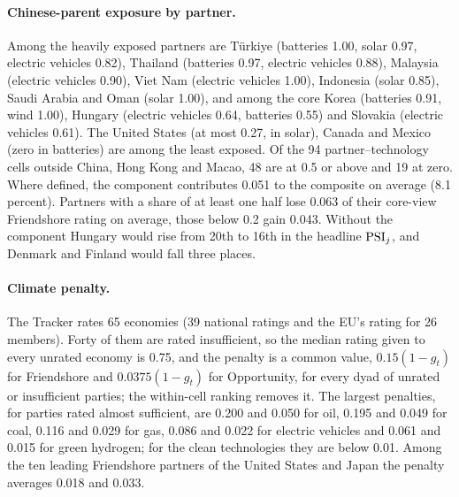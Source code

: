 \paragraph{Chinese-parent exposure by partner.} Among the heavily exposed partners are T\"urkiye
(batteries 1.00, solar 0.97, electric vehicles 0.82), Thailand (batteries 0.97, electric vehicles
0.88), Malaysia (electric vehicles 0.90), Viet Nam (electric vehicles 1.00), Indonesia (solar 0.85),
Saudi Arabia and Oman (solar 1.00), and among the core Korea (batteries 0.91, wind 1.00), Hungary
(electric vehicles 0.64, batteries 0.55) and Slovakia (electric vehicles 0.61). The United States
(at most 0.27, in solar), Canada and Mexico (zero in batteries) are among the least exposed. Of the
94 partner--technology cells outside China, Hong Kong and Macao, 48 are at 0.5 or above and 19 at
zero. Where defined, the component contributes 0.051 to the composite on average (8.1 percent).
Partners with a share of at least one half lose 0.063 of their core-view Friendshore rating on
average, those below 0.2 gain 0.043. Without the component Hungary would rise from 20th to 16th in
the headline $\mathrm{PSI}_j$, and Denmark and Finland would fall three places.

\paragraph{Climate penalty.} The Tracker rates 65 economies (39 national ratings and the EU's
rating for 26 members). Forty of them are rated insufficient, so the median rating given to every
unrated economy is 0.75, and the penalty is a common value, $0.15(1-g_t)$ for Friendshore and
$0.0375(1-g_t)$ for Opportunity, for every dyad of unrated or insufficient parties; the within-cell
ranking removes it. The largest penalties, for parties rated almost sufficient, are 0.200 and 0.050
for oil, 0.195 and 0.049 for coal, 0.116 and 0.029 for gas, 0.086 and 0.022 for electric vehicles
and 0.061 and 0.015 for green hydrogen; for the clean technologies they are below 0.01. Among the
ten leading Friendshore partners of the United States and Japan the penalty averages 0.018 and 0.033.


